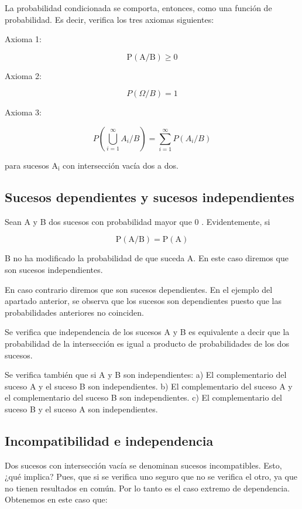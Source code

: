 \documentclass[
  a4paper,
  DIV=11,
  numbers=noendperiod]{scrreprt}
\begin{document}
La probabilidad condicionada se comporta, entonces, como una función de
probabilidad. Es decir, verifica los tres axiomas siguientes:

Axioma 1:

\[
\mathrm{P}(\mathrm{A} / \mathrm{B}) \geq 0
\]

Axioma 2:

\[
P(\Omega / B)=1
\]

Axioma 3:

\[
P\left(\bigcup_{i=1}^{\infty} A_{i} / B\right)=\sum_{i=1}^{\infty} P\left(A_{i} / B\right)
\]

para sucesos \(\mathrm{A}_{\mathrm{i}}\) con intersección vacía dos a
dos.

\subsection{Sucesos dependientes y sucesos
independientes}\label{sucesos-dependientes-y-sucesos-independientes}

Sean A y B dos sucesos con probabilidad mayor que 0 . Evidentemente, si

\[
\mathrm{P}(\mathrm{A} / \mathrm{B})=\mathrm{P}(\mathrm{A})
\]

B no ha modificado la probabilidad de que suceda A. En este caso diremos
que son sucesos independientes.

En caso contrario diremos que son sucesos dependientes. En el ejemplo
del apartado anterior, se observa que los sucesos son dependientes
puesto que las probabilidades anteriores no coinciden.

Se verifica que independencia de los sucesos A y B es equivalente a
decir que la probabilidad de la intersección es igual a producto de
probabilidades de los dos sucesos.

Se verifica también que si A y B son independientes: a) El
complementario del suceso A y el suceso B son independientes. b) El
complementario del suceso A y el complementario del suceso B son
independientes. c) El complementario del suceso B y el suceso A son
independientes.

\subsection{Incompatibilidad e
independencia}\label{incompatibilidad-e-independencia}

Dos sucesos con intersección vacía se denominan sucesos incompatibles.
Esto, ¿qué implica? Pues, que si se verifica uno seguro que no se
verifica el otro, ya que no tienen resultados en común. Por lo tanto es
el caso extremo de dependencia. Obtenemos en este caso que:
\end{document}
